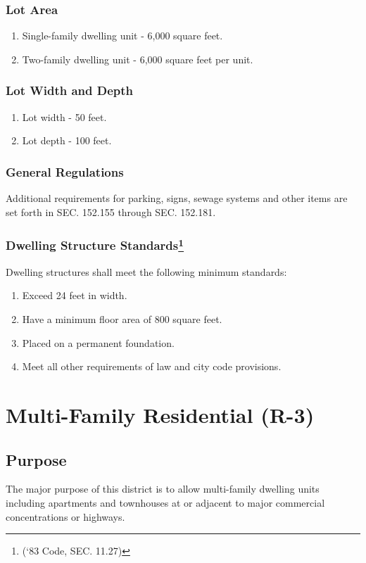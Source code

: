 \subsubsection{Lot Area}
\begin{enumerate}[{\indent}a)]
    \item Single-family dwelling unit - 6,000 square feet.
    \item Two-family dwelling unit - 6,000 square feet per unit.
\end{enumerate}
\subsubsection{Lot Width and Depth}
\begin{enumerate}[{\indent}a)]
    \item Lot width - 50 feet.
    \item Lot depth - 100 feet.
\end{enumerate}
\subsubsection{General Regulations}
Additional requirements for parking, signs, sewage systems and other items are set forth in SEC. 152.155 through SEC. 152.181.
\subsubsection{Dwelling Structure Standards\footnote{(‘83 Code, SEC. 11.27)}}
Dwelling structures shall meet the following minimum standards:
\begin{enumerate}[{\indent}a)]
    \item Exceed 24 feet in width.
    \item Have a minimum floor area of 800 square feet.
    \item Placed on a permanent foundation.
    \item Meet all other requirements of law and city code provisions.
\end{enumerate}
\section{Multi-Family Residential (R-3)}
\subsection{Purpose}
The major purpose of this district is to allow multi-family dwelling units including apartments and townhouses at or adjacent to major commercial concentrations or highways.
